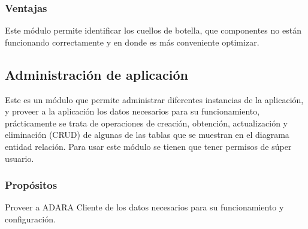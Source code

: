 \documentclass[12pt,a4paper,spanish,openany]{book}
\begin{document}
\subsubsection{Ventajas}

Este módulo permite identificar los cuellos de botella, que componentes no están
funcionando correctamente y en donde es más conveniente optimizar.
 

 


\subsection{Administración de aplicación}
Este es un módulo que permite administrar diferentes instancias de la aplicación,
y proveer a la aplicación los datos necesarios para su funcionamiento,
prácticamente se trata de operaciones de creación, obtención, actualización y
eliminación (CRUD) de algunas de las tablas que se muestran en el diagrama
entidad relación. 
Para usar este módulo se tienen que tener permisos de súper usuario. 

\subsubsection{Propósitos}
Proveer a ADARA Cliente de los datos necesarios para su funcionamiento y
configuración.
\end{document}
